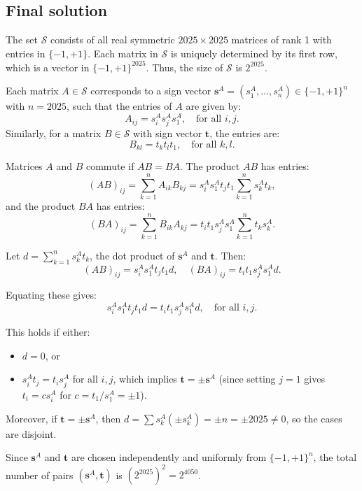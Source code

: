 \documentclass[12pt,a4paper]{article}
\theoremstyle{definition}
\begin{document}
    \subsection{Final solution}
    The set $\mathcal{S}$ consists of all real symmetric $2025 \times 2025$ matrices of rank 1 with entries in $\{-1, +1\}$. Each matrix in $\mathcal{S}$ is uniquely determined by its first row, which is a vector in $\{-1, +1\}^{2025}$. Thus, the size of $\mathcal{S}$ is $2^{2025}$.

    Each matrix $A \in \mathcal{S}$ corresponds to a sign vector $\mathbf{s}^A = (s_1^A, \dots, s_n^A) \in \{-1, +1\}^n$ with $n = 2025$, such that the entries of $A$ are given by:
    \[
        A_{ij} = s_i^A s_j^A s_1^A, \quad \text{for all } i,j.
    \]
    Similarly, for a matrix $B \in \mathcal{S}$ with sign vector $\mathbf{t}$, the entries are:
    \[
        B_{kl} = t_k t_l t_1, \quad \text{for all } k,l.
    \]

    Matrices $A$ and $B$ commute if $AB = BA$. The product $AB$ has entries:
    \[
        (AB)_{ij} = \sum_{k=1}^n A_{ik} B_{kj} = s_i^A s_1^A t_j t_1 \sum_{k=1}^n s_k^A t_k,
    \]
    and the product $BA$ has entries:
    \[
        (BA)_{ij} = \sum_{k=1}^n B_{ik} A_{kj} = t_i t_1 s_j^A s_1^A \sum_{k=1}^n t_k s_k^A.
    \]

    Let $d = \sum_{k=1}^n s_k^A t_k$, the dot product of $\mathbf{s}^A$ and $\mathbf{t}$. Then:
    \[
        (AB)_{ij} = s_i^A s_1^A t_j t_1 d, \quad (BA)_{ij} = t_i t_1 s_j^A s_1^A d.
    \]

    Equating these gives:
    \[
        s_i^A s_1^A t_j t_1 d = t_i t_1 s_j^A s_1^A d, \quad \text{for all } i,j.
    \]

    This holds if either:
    \begin{itemize}
        \item $d = 0$, or
        \item $s_i^A t_j = t_i s_j^A$ for all $i,j$, which implies $\mathbf{t} = \pm \mathbf{s}^A$ (since setting $j=1$ gives $t_i = c s_i^A$ for $c = t_1 / s_1^A = \pm 1$).
    \end{itemize}

    Moreover, if $\mathbf{t} = \pm \mathbf{s}^A$, then $d = \sum s_k^A (\pm s_k^A) = \pm n = \pm 2025 \neq 0$, so the cases are disjoint.

    Since $\mathbf{s}^A$ and $\mathbf{t}$ are chosen independently and uniformly from $\{-1, +1\}^n$, the total number of pairs $(\mathbf{s}^A, \mathbf{t})$ is $(2^{2025})^2 = 2^{4050}$.
\end{document}
